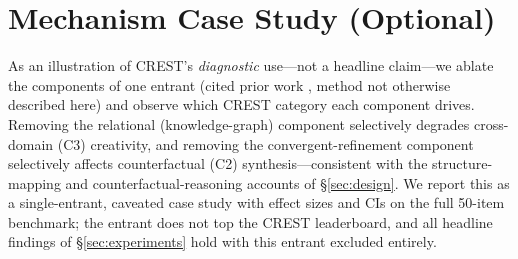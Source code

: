 \section{Mechanism Case Study (Optional)}
\label{sec:mechanism}

As an illustration of CREST's \emph{diagnostic} use---not a headline claim---we ablate the components of one entrant (cited prior work \citep{caesar2026}, method not otherwise described here) and observe which CREST category each component drives. Removing the relational (knowledge-graph) component selectively degrades cross-domain (C3) creativity, and removing the convergent-refinement component selectively affects counterfactual (C2) synthesis---consistent with the structure-mapping and counterfactual-reasoning accounts of \S\ref{sec:design}. We report this as a single-entrant, caveated case study with effect sizes and CIs on the full 50-item benchmark; the entrant does not top the CREST leaderboard, and all headline findings of \S\ref{sec:experiments} hold with this entrant excluded entirely.
